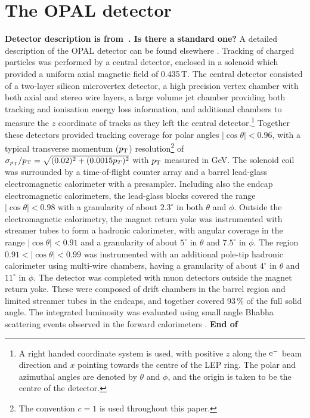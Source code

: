 
 


\section{The OPAL detector}
\label{sec:detector}
{\bf Detector description is from~\cite{Abbiendi:2005eq}. Is there a standard one?}
A detailed description of the OPAL detector can be found elsewhere 
\cite{Ahmet:1990eg, Anderson:1997xwa}. Tracking of charged particles was performed by a central
detector, enclosed in a solenoid which provided a uniform axial magnetic field
of 0.435\,T.  The central detector consisted of a two-layer silicon 
microvertex detector, a high precision vertex chamber with both axial
and stereo wire layers, a large volume jet chamber providing both tracking
and ionisation energy loss information,
and additional chambers to measure the $z$ coordinate of tracks as they
left the central detector.\footnote{A right handed coordinate system is used,
with positive $z$ along the $\rm e^-$ beam direction and $x$ pointing 
towards the centre of the LEP ring. The polar and azimuthal angles are denoted
by $\theta$ and $\phi$, and the origin is taken to be the centre of the
detector.} Together these detectors provided tracking coverage for polar angles
$|\cos\theta|<0.96$, with a typical transverse momentum ($p_{\rm T}$) 
resolution\footnote{The convention $c=1$ is used throughout this paper.} of 
$\sigma_{p_{\rm T}}/p_{\rm T}=\sqrt{(0.02)^2+(0.0015p_T)^2}$ 
with $p_{\rm T}$ measured in GeV.
The solenoid coil was surrounded by a time-of-flight counter array and 
a barrel lead-glass electromagnetic calorimeter with a presampler. Including
also the endcap electromagnetic calorimeters, the lead-glass blocks covered
the range $|\cos\theta|<0.98$ with a granularity of about $2.3^\circ$ in both
$\theta$ and $\phi$.
Outside the electromagnetic calorimetry, 
the magnet return yoke was instrumented with
streamer tubes to form a hadronic calorimeter, with angular coverage in the
range $|\cos\theta|<0.91$ and a granularity of about $5^\circ$ in $\theta$
and $7.5^\circ$ in $\phi$. The region $0.91<|\cos\theta|<0.99$ was instrumented
with an additional pole-tip hadronic calorimeter using multi-wire chambers,
having a granularity of about $4^\circ$ in $\theta$ and $11^\circ$ in $\phi$.
The detector was completed
with muon detectors outside the magnet return yoke. These were composed
of drift chambers in the barrel region and limited streamer tubes in the
endcaps, and together covered 93\,\% of the full solid angle.
The integrated luminosity was evaluated using small
angle Bhabha scattering events observed in the forward calorimeters 
\cite{Abbiendi:2003dh}. 
{\bf End of~\cite{Abbiendi:2005eq}}

